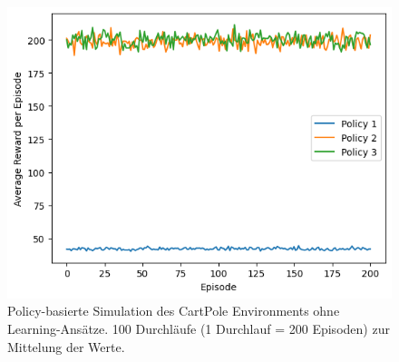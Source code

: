 \documentclass[11pt]{article}
\begin{document}
\begin{figure}
    \centering
    \includegraphics[width=\textwidth]{img/img_2_3_b.png}
    \caption{Policy-basierte Simulation des CartPole Environments ohne Learning-Ansätze. 100 Durchläufe (1 Durchlauf = 200 Episoden) zur Mittelung der Werte.}
    \label{img:2_3_b}
\end{figure}
\end{document}
